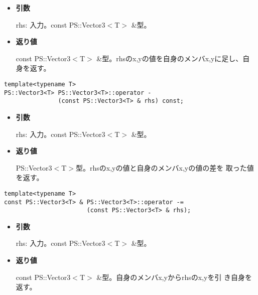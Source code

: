 \begin{itemize}

\item{{\bf 引数}}

{rhs}: 入力。{const PS::Vector3$<$T$>$ \&}型。

\item{{\bf 返り値}}

{const PS::Vector3$<$T$>$ \&}型。{rhs}のx,yの値を自身のメンバx,yに足し、自
身を返す。

\end{itemize}


\begin{screen}
\begin{verbatim}
template<typename T>
PS::Vector3<T> PS::Vector3<T>::operator - 
               (const PS::Vector3<T> & rhs) const;
\end{verbatim}
\end{screen}

\begin{itemize}

\item{{\bf 引数}}

{rhs}: 入力。{const PS::Vector3$<$T$>$ \&}型。

\item{{\bf 返り値}}

{PS::Vector3$<$T$>$}型。{rhs}のx,yの値と自身のメンバx,yの値の差を
取った値を返す。

\end{itemize}


\begin{screen}
\begin{verbatim}
template<typename T>
const PS::Vector3<T> & PS::Vector3<T>::operator -= 
                       (const PS::Vector3<T> & rhs);
\end{verbatim}
\end{screen}

\begin{itemize}

\item{{\bf 引数}}

{rhs}: 入力。{const PS::Vector3$<$T$>$ \&}型。

\item{{\bf 返り値}}

{const PS::Vector3$<$T$>$ \&}型。自身のメンバx,yから{rhs}のx,yを引
き自身を返す。

\end{itemize}

